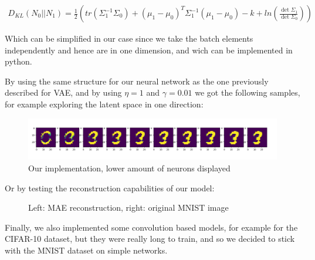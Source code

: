 \documentclass{article} %
\begin{document}
\begin{align}\label{loss1}
  D_{KL}(N_0||N_1) = \frac{1}{2}(tr(\Sigma_1^{-1}\Sigma_0) + (\mu_1 - \mu_0)^T\Sigma_1^{-1}(\mu_1 - \mu_0) - k + ln(\frac{\det \Sigma_1}{\det \Sigma_0}))
\end{align}

Which can be simplified in our case since we take the batch elements
independently and hence are in one dimension, and wich can be implemented in
python.

By using the same structure for our neural network as the one previously
described for VAE, and by using $\eta = 1$ and $\gamma = 0.01$ we got the
following samples, for example exploring the latent space in one direction:

\begin{figure}
  \centering
      \includegraphics[width=1.0\textwidth]{latent_expl_4}
  \caption{Our implementation, lower amount of neurons displayed}
\end{figure}

Or by testing the reconstruction capabilities of our model:

\begin{figure}%
  \centering
  \qquad
  \caption{Left: MAE reconstruction, right: original MNIST image}%
  \label{fig:vae}%
\end{figure}


Finally, we also implemented some convolution based models, for example for the
CIFAR-10 dataset, but they were really long to train, and so we decided to stick
with the MNIST dataset on simple networks.
\end{document}
